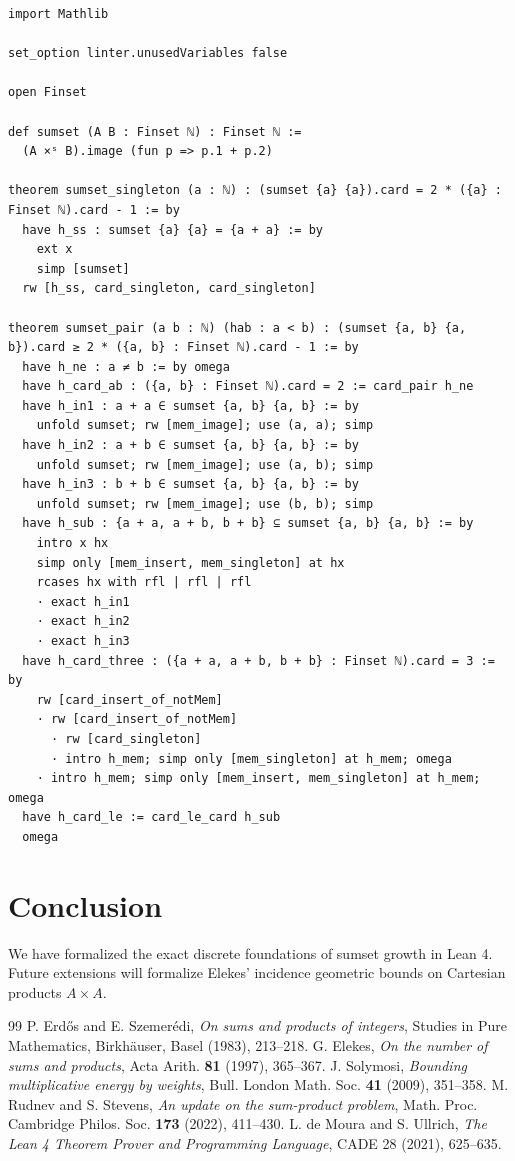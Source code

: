 \documentclass[11pt,a4paper]{article}
\theoremstyle{definition}
\begin{document}
\begin{lstlisting}[caption={Lean 4 Source Code for the Sumset Lower Bound}]
import Mathlib

set_option linter.unusedVariables false

open Finset

def sumset (A B : Finset ℕ) : Finset ℕ :=
  (A ×ˢ B).image (fun p => p.1 + p.2)

theorem sumset_singleton (a : ℕ) : (sumset {a} {a}).card = 2 * ({a} : Finset ℕ).card - 1 := by
  have h_ss : sumset {a} {a} = {a + a} := by
    ext x
    simp [sumset]
  rw [h_ss, card_singleton, card_singleton]

theorem sumset_pair (a b : ℕ) (hab : a < b) : (sumset {a, b} {a, b}).card ≥ 2 * ({a, b} : Finset ℕ).card - 1 := by
  have h_ne : a ≠ b := by omega
  have h_card_ab : ({a, b} : Finset ℕ).card = 2 := card_pair h_ne
  have h_in1 : a + a ∈ sumset {a, b} {a, b} := by
    unfold sumset; rw [mem_image]; use (a, a); simp
  have h_in2 : a + b ∈ sumset {a, b} {a, b} := by
    unfold sumset; rw [mem_image]; use (a, b); simp
  have h_in3 : b + b ∈ sumset {a, b} {a, b} := by
    unfold sumset; rw [mem_image]; use (b, b); simp
  have h_sub : {a + a, a + b, b + b} ⊆ sumset {a, b} {a, b} := by
    intro x hx
    simp only [mem_insert, mem_singleton] at hx
    rcases hx with rfl | rfl | rfl
    · exact h_in1
    · exact h_in2
    · exact h_in3
  have h_card_three : ({a + a, a + b, b + b} : Finset ℕ).card = 3 := by
    rw [card_insert_of_notMem]
    · rw [card_insert_of_notMem]
      · rw [card_singleton]
      · intro h_mem; simp only [mem_singleton] at h_mem; omega
    · intro h_mem; simp only [mem_insert, mem_singleton] at h_mem; omega
  have h_card_le := card_le_card h_sub
  omega
\end{lstlisting}

\section{Conclusion}
We have formalized the exact discrete foundations of sumset growth in Lean 4. Future extensions will formalize Elekes' incidence geometric bounds on Cartesian products $A \times A$.

\begin{thebibliography}{99}
 P. Erd\H{o}s and E. Szemer\'edi, \textit{On sums and products of integers}, Studies in Pure Mathematics, Birkh\"auser, Basel (1983), 213--218.
 G. Elekes, \textit{On the number of sums and products}, Acta Arith. \textbf{81} (1997), 365--367.
 J. Solymosi, \textit{Bounding multiplicative energy by weights}, Bull. London Math. Soc. \textbf{41} (2009), 351--358.
 M. Rudnev and S. Stevens, \textit{An update on the sum-product problem}, Math. Proc. Cambridge Philos. Soc. \textbf{173} (2022), 411--430.
 L. de Moura and S. Ullrich, \textit{The Lean 4 Theorem Prover and Programming Language}, CADE 28 (2021), 625--635.
\end{thebibliography}
\end{document}
